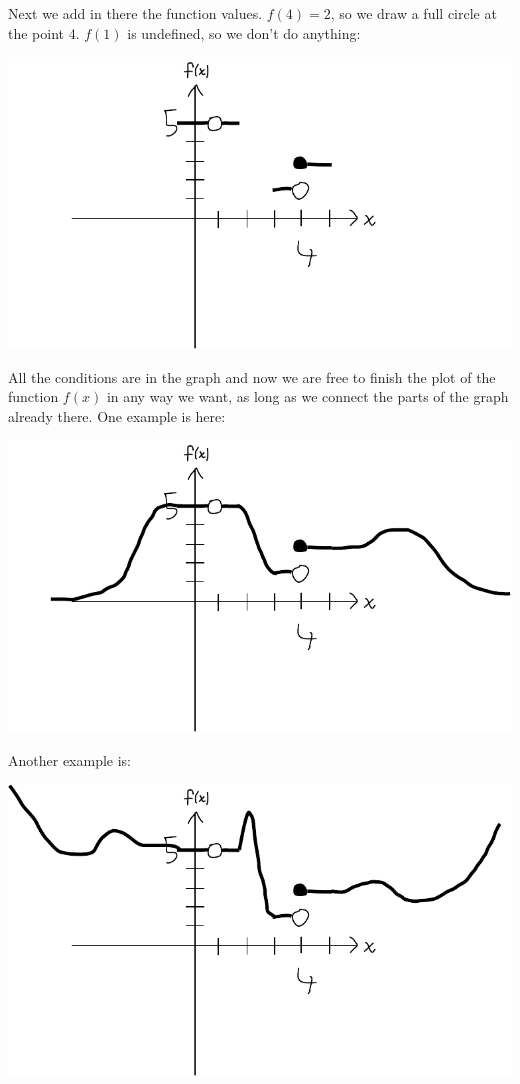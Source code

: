 \documentclass[10pt]{article}
\begin{document}
Next we add in there the function values. $f(4)=2$, so we draw a full circle at
the point 4. $f(1)$ is undefined, so we don't do anything:

\includegraphics{diag2.pdf}

All the conditions are in the graph and now we are free to finish the plot of
the function $f(x)$ in any way we want, as long as we connect the parts of the
graph already there. One example is here:

\includegraphics{diag3.pdf}

Another example is:

\includegraphics{diag4.pdf}
\end{document}
